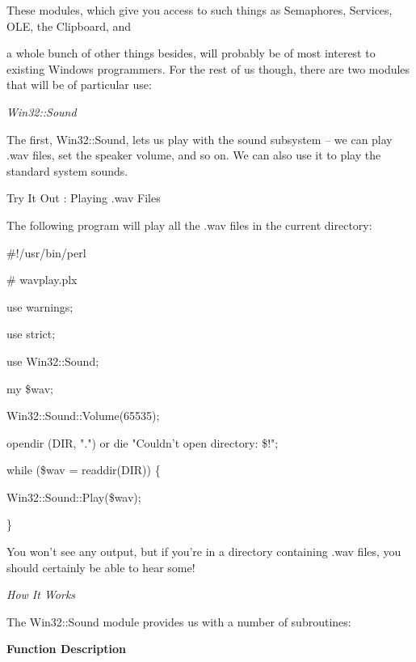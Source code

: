 \documentclass[a4paper,11pt]{book}
\begin{document}
\noindent These modules, which give you access to such things as Semaphores, Services, OLE, the Clipboard, and

\noindent a whole bunch of other things besides, will probably be of most interest to existing Windows programmers. For the rest of us though, there are two modules that will be of particular use:

\noindent 

\noindent \textit{Win32::Sound}

\noindent The first, Win32::Sound, lets us play with the sound subsystem -- we can play .wav files, set the speaker volume, and so on. We can also use it to play the standard system sounds.

\noindent 

\noindent Try It Out : Playing .wav Files

\noindent 

\noindent The following program will play all the .wav files in the current directory:

\noindent 

\noindent \#!/usr/bin/perl

\noindent \# wavplay.plx

\noindent use warnings;

\noindent use strict;

\noindent use Win32::Sound;

\noindent 

\noindent my \$wav;

\noindent Win32::Sound::Volume(65535);

\noindent opendir (DIR, ".") or die "Couldn't open directory: \$!";

\noindent while (\$wav = readdir(DIR)) \{

\noindent Win32::Sound::Play(\$wav);

\noindent \}

\noindent 

\noindent You won't see any output, but if you're in a directory containing .wav files, you should certainly be able to hear some!

\noindent 

\noindent 

\noindent \textit{How It Works}

\noindent The Win32::Sound module provides us with a number of subroutines:

\noindent 

\noindent \textbf{Function Description}
\end{document}

